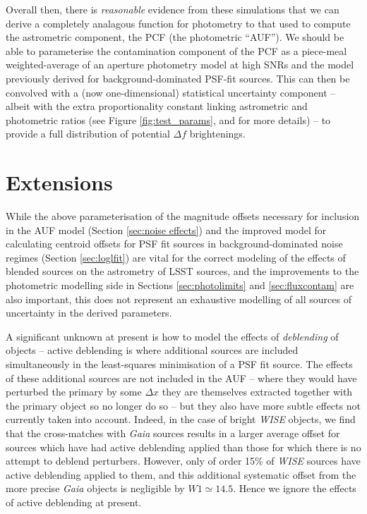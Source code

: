 \documentclass[fleqn,usenatbib]{mnras}
\begin{document}
Overall then, there is \textit{reasonable} evidence from these simulations that we can derive a completely analagous function for photometry to that used to compute the astrometric component, the PCF (the photometric ``AUF'').
We should be able to parameterise the contamination component of the PCF as a piece-meal weighted-average of an aperture photometry model at high SNRs and the model previously derived for background-dominated PSF-fit sources.
This can then be convolved with a (now one-dimensional) statistical uncertainty component -- albeit with the extra proportionality constant linking astrometric and photometric ratios (see Figure \ref{fig:test_params}, and \citealp{King:1983aa} for more details) -- to provide a full distribution of potential $\Delta f$ brightenings.

\section{Extensions}
\label{sec:extension}
While the above parameterisation of the magnitude offsets necessary for inclusion in the AUF model (Section \ref{sec:noise effects}) and the improved model for calculating centroid offsets for PSF fit sources in background-dominated noise regimes (Section \ref{sec:loglfit}) are vital for the correct modeling of the effects of blended sources on the astrometry of LSST sources, and the improvements to the photometric modelling side in Sections \ref{sec:photolimits} and \ref{sec:fluxcontam} are also important, this does not represent an exhaustive modelling of all sources of uncertainty in the derived parameters.

A significant unknown at present is how to model the effects of \textit{deblending} of objects -- active deblending is where additional sources are included simultaneously in the least-squares minimisation of a PSF fit source. 
The effects of these additional sources are not included in the AUF -- where they would have perturbed the primary by some $\Delta x$ they are themselves extracted together with the primary object so no longer do so -- but they also have more subtle effects not currently taken into account.
Indeed, in the case of bright \textit{WISE} objects, we find that the cross-matches with \textit{Gaia} sources results in a larger average offset for sources which have had active deblending applied than those for which there is no attempt to deblend perturbers.
However, only of order 15\% of \textit{WISE} sources have active deblending applied to them, and this additional systematic offset from the more precise \textit{Gaia} objects is negligible by $W1\simeq14.5$.
Hence we ignore the effects of active deblending at present.
\end{document}
